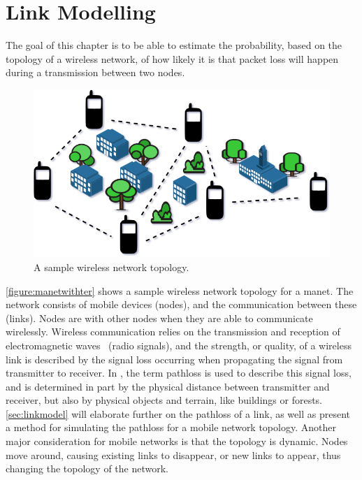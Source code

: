\chapter{Link Modelling}\label{ch:linkmodel}
The goal of this chapter is to be able to estimate the probability, based on the topology of a wireless network, of how likely it is that packet loss will happen during a transmission between two nodes.

\begin{figure}[ht]
    \centering
    \includegraphics[width=.7\textwidth]{figures/manet_with_terrain.png}
    \caption{A sample wireless network topology.}
    \label{figure:manetwithter}
\end{figure}

\autoref{figure:manetwithter} shows a sample wireless network topology for a \acrfull{manet}. The network consists of mobile devices (nodes), and the communication between these (links). Nodes are  with other nodes when they are able to communicate wirelessly. Wireless communication relies on the transmission and reception of electromagnetic waves~\cite[p.~10]{paper:linkmodel} (radio signals), and the strength, or quality, of a wireless link is described by the signal loss occurring when propagating the signal from transmitter to receiver. In \cite{paper:linkmodel}, the term \gls{pathloss} is used to describe this signal loss, and is determined in part by the physical distance between transmitter and receiver, but also by physical objects and terrain, like buildings or forests. \autoref{sec:linkmodel} will elaborate further on the \gls{pathloss} of a link, as well as present a method for simulating the \gls{pathloss} for a mobile network topology. Another major consideration for mobile networks is that the topology is dynamic. Nodes move around, causing existing links to disappear, or new links to appear, thus changing the topology of the network.


